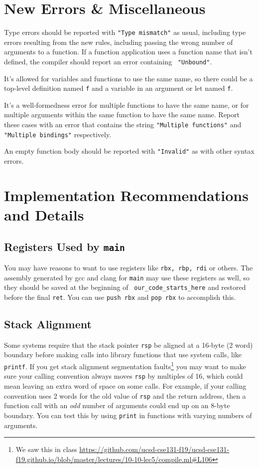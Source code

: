 \documentclass[10pt, oneside]{article}
\begin{document}
\section*{New Errors \& Miscellaneous}

Type errors should be reported with {\tt "Type mismatch"} as usual, including
type errors resulting from the new rules, including passing the wrong number
of arguments to a function. If a function application uses a function name
that isn't defined, the compiler should report an error containing {\tt
"Unbound"}.

It's allowed for variables and functions to use the same name, so there could
be a top-level definition named {\tt f} and a variable in an argument or let
named {\tt f}.

It's a well-formedness error for multiple functions to have the same name, or
for multiple arguments within the same function to have the same name. Report
these cases with an error that contains the string {\tt "Multiple functions"}
and {\tt "Multiple bindings"} respectively.

An empty function body should be reported with {\tt "Invalid"} as with other
syntax errors.

\section*{Implementation Recommendations and Details}

\subsection*{Registers Used by {\tt main}}

You may have reasons to want to use registers like {\tt rbx, rbp, rdi} or
others. The assembly generated by gcc and clang for {\tt main} may use these
registers as well, so they should be saved at the beginning of {\tt
our\_code\_starts\_here} and restored before the final {\tt ret}. You can use
{\tt push rbx} and {\tt pop rbx} to accomplish this.

\subsection*{Stack Alignment}

Some systems require that the stack pointer {\tt rsp} be aligned at a 16-byte
(2 word) boundary before making calls into library functions that use system
calls, like {\tt printf}. If you get stack alignment segmentation
faults\footnote{We saw this in class
\url{https://github.com/ucsd-cse131-f19/ucsd-cse131-f19.github.io/blob/master/lectures/10-10-lec5/compile.ml\#L106}}
you may want to make sure your calling convention always moves {\tt rsp} by
multiples of 16, which could mean leaving an extra word of space on some
calls. For example, if your calling convention uses 2 words for the old value
of {\tt rsp} and the return address, then a function call with an {\it odd}
number of arguments could end up on an 8-byte boundary. You can test this by
using {\tt print} in functions with varying numbers of arguments.
\end{document}
